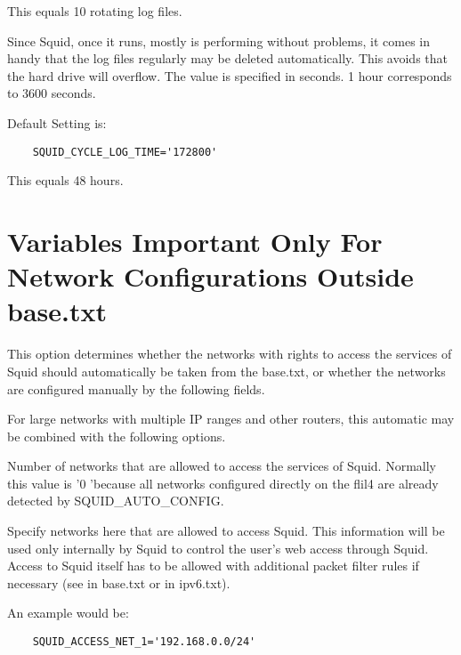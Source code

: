 \begin{description}
                This equals 10 rotating log files.



		Since Squid, once it runs, mostly is performing without problems,
		it comes in handy that the log files regularly may be deleted automatically.
		This avoids that the hard drive will overflow. The value is specified in seconds.
		1 hour corresponds to 3600 seconds.

                Default Setting is:
\begin{verbatim}
	SQUID_CYCLE_LOG_TIME='172800'
\end{verbatim}

                This equals 48 hours.


\section{Variables Important Only For Network Configurations Outside base.txt}


		This option determines whether the networks with rights to access the services
		of Squid should automatically be taken from the base.txt, or whether the networks
		are configured manually by the following fields.

		For large networks with multiple IP ranges and other
		routers, this automatic may be combined with the following options.


		Number of networks that are allowed to access the services of Squid.
		Normally this value is '0 'because all networks configured directly on the
		flil4 are already detected by SQUID\_AUTO\_CONFIG.


                Specify networks here that are allowed to access Squid.
                This information will be used only internally by Squid
                to control the user's web access through Squid. Access to Squid itself
                has to be allowed with additional packet filter rules if necessary
                (see  in base.txt or  in
                ipv6.txt).

                An example would be:
\begin{verbatim}
	SQUID_ACCESS_NET_1='192.168.0.0/24'
\end{verbatim}


\end{description}
